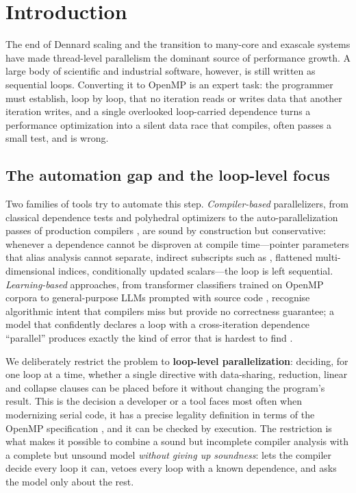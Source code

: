 \section{Introduction}
\label{sec:introduction}

The end of Dennard scaling and the transition to many-core and exascale systems \cite{sutter2005,flynn2007,dongarra2023} have made thread-level parallelism the dominant source of performance growth. A large body of scientific and industrial software, however, is still written as sequential loops. Converting it to OpenMP is an expert task: the programmer must establish, loop by loop, that no iteration reads or writes data that another iteration writes, and a single overlooked loop-carried dependence turns a performance optimization into a silent data race that compiles, often passes a small test, and is wrong.

\subsection{The automation gap and the loop-level focus}
Two families of tools try to automate this step. \emph{Compiler-based} parallelizers, from classical dependence tests \cite{banerjee1988,pugh1992} and polyhedral optimizers \cite{feautrier1991,bondhugula2008,grosser2012} to the auto-parallelization passes of production compilers \cite{gccparloops}, are sound by construction but conservative: whenever a dependence cannot be disproven at compile time---pointer parameters that alias analysis cannot separate, indirect subscripts such as , flattened multi-dimensional indices, conditionally updated scalars---the loop is left sequential. \emph{Learning-based} approaches, from transformer classifiers trained on OpenMP corpora \cite{harel2023pragformer,kadosh2023ompify,kadosh2024ompar} to general-purpose LLMs prompted with source code \cite{nichols2024pareval,mahmud2025autoparllm}, recognise algorithmic intent that compilers miss but provide no correctness guarantee; a model that confidently declares a loop with a cross-iteration dependence ``parallel'' produces exactly the kind of error that is hardest to find \cite{pearce2022asleep}.

We deliberately restrict the problem to \textbf{loop-level parallelization}: deciding, for one loop at a time, whether a single  directive with data-sharing, reduction, linear and collapse clauses can be placed before it without changing the program's result. This is the decision a developer or a tool faces most often when modernizing serial code, it has a precise legality definition in terms of the OpenMP specification \cite{openmp52}, and it can be checked by execution. The restriction is what makes it possible to combine a sound but incomplete compiler analysis with a complete but unsound model \emph{without giving up soundness}: \SystemName{} lets the compiler decide every loop it can, vetoes every loop with a known dependence, and asks the model only about the rest.


